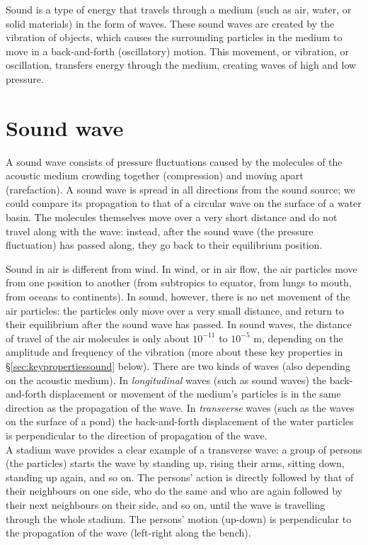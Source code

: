 \documentclass[
]{book}
\begin{document}
Sound is a type of energy that travels through a medium (such as air, water, or solid materials) in the form of waves. These sound waves are created by the vibration of objects, which causes the surrounding particles in the medium to move in a back-and-forth (oscillatory) motion. This movement, or vibration, or oscillation, transfers energy through the medium, creating waves of high and low pressure.

\section{Sound wave}\label{sec:soundwave}

A sound wave consists of pressure fluctuations caused by the molecules of the acoustic medium crowding together (compression) and moving apart (rarefaction). A sound wave is spread in all directions from the sound source; we could compare its propagation to that of a circular wave on the surface of a water basin. The molecules themselves move over a very short distance and do not travel along with the wave: instead, after the sound wave (the pressure fluctuation) has passed along, they go back to their equilibrium position.

Sound in air is different from wind. In wind, or in air flow, the air particles move from one position to another (from subtropics to equator, from lungs to mouth, from oceans to continents). In sound, however, there is no net movement of the air particles: the particles only move over a very small distance, and return to their equilibrium after the sound wave has passed. In sound waves, the distance of travel of the air molecules is only about \(10^{-11}\) to \(10^{-5}\) m, depending on the amplitude and frequency of the vibration (more about these key properties in §\ref{sec:keypropertiessound} below).
There are two kinds of waves (also depending on the acoustic medium). In \emph{longitudinal} waves (such as sound waves) the back-and-forth displacement or movement of the medium's particles is in the same direction as the propagation of the wave. In \emph{transverse} waves (such as the waves on the surface of a pond) the back-and-forth displacement of the water particles is perpendicular to the direction of propagation of the wave.\\
A stadium wave provides a clear example of a transverse wave: a group of persons (the particles) starts the wave by standing up, rising their arms, sitting down, standing up again, and so on. The persons' action is directly followed by that of their neighbours on one side, who do the same and who are again followed by their next neighbours on their side, and so on, until the wave is travelling through the whole stadium. The persons' motion (up-down) is perpendicular to the propagation of the wave (left-right along the bench).
\end{document}
